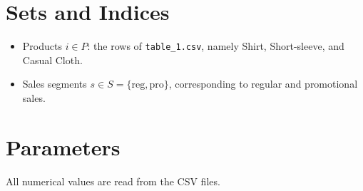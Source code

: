 \section*{Sets and Indices}

\begin{itemize}
    \item Products $i \in P$: the rows of \texttt{table\_1.csv}, namely Shirt, Short-sleeve, and Casual Cloth.
    \item Sales segments $s \in S = \{\mathrm{reg},\mathrm{pro}\}$, corresponding to regular and promotional sales.
\end{itemize}

\section*{Parameters}

All numerical values are read from the CSV files.

